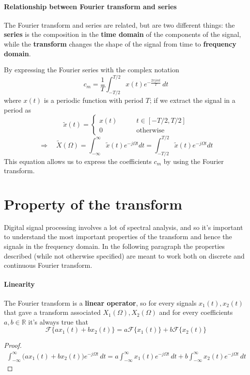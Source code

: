 	\paragraph{Relationship between Fourier transform and series} 
	The Fourier transform and series are related, but are two different things: the \textbf{series} is the composition in the \textbf{time domain} of the components of the signal, while the \textbf{transform} changes the shape of the signal from time to \textbf{frequency domain}.
	
	By expressing the Fourier series with the complex notation
	\[ c_m = \frac 1 T \int_{-T/2}^{T/2} x(t) e^{-\frac{2\pi j m t}{T} } \, dt \]
	where $x(t)$ is a periodic function with period $T$; if we extract the signal in a period as
	\[\tilde x(t) = \begin{cases}
		x(t) \qquad & t \in [-T/2,T/2] \\ 0 & \textrm{otherwise}
	\end{cases} \]
	\[ \Rightarrow \quad \tilde X(\Omega) = \int_{-\infty}^{\infty} \tilde x(t) e^{-j\Omega t} dt = \int_{-T/2}^{T/2} \tilde x(t) e^{-j\Omega t} dt \]
	This equation allows us to express the coefficients $c_m$ by using the Fourier transform.
	
	
\section{Property of the transform}
	
	Digital signal processing involves a lot of spectral analysis, and so it's important to understand the most important properties of the transform and hence the signals in the frequency domain. In the following paragraph the properties described (while not otherwise specified) are meant to work both on discrete and continuous Fourier transform.
	
	\paragraph{Linearity} The Fourier transform is a \textbf{linear operator}, so for every signals $x_1(t),x_2(t)$ that gave a transform associated $X_1(\Omega),X_2(\Omega)$ and for every coefficients $a,b\in \mathds R$ it's always true that
	\begin{equation}
		\mathscr{F} \big\{ a x_1(t) + b x_2(t) \big\} = a \mathscr{F}\big\{x_1(t)\big\} + b \mathscr{F}\big\{x_2(t)\big\}
	\end{equation}
	\begin{proof}
			\begin{align*}
				\int_{-\infty}^\infty \Big(a x_1 (t) + bx_2(t)\Big) e ^{-j\Omega t} \, dt = a \int_{-\infty}^\infty x_1 (t)  e ^{-j\Omega t} \, dt + b \int_{-\infty}^\infty x_2 (t)  e ^{-j\Omega t} \, dt 
			\end{align*}
	\end{proof}
	
